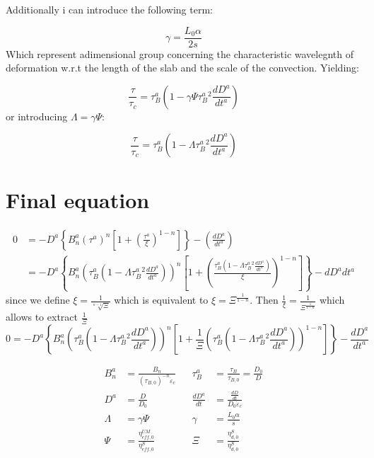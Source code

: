 \documentclass{article}
\begin{document}
Additionally i can introduce the following term: 

\begin{equation}
    \gamma = \frac{L_0 \alpha}{2 s}
\end{equation}
Which represent adimensional group concerning the characteristic wavelegnth of deformation w.r.t the length of the slab and the scale of the convection. 
Yielding: 

\begin{equation}
    \frac{\tau}{\tau_c} = \tau^{a}_{B} \left( 1-\gamma \Psi \tau^{a}_B^2 \frac{dD^{a}}{dt^{a}}\right)
    \label{eq:no_d_tau_eff}
\end{equation}
or introducing $\Lambda= \gamma \Psi$: 

\begin{equation}
    \frac{\tau}{\tau_c} = \tau^{a}_{B} \left( 1-\Lambda \tau^{a}_B^2 \frac{dD^{a}}{dt^{a}}\right)
    \label{eq:no_d_tau_eff}
\end{equation}

\section{Final equation}

\begin{align}
    0 &= -D^{a} \left\{B_n^{a}  \left(\tau^{a}\right)^n \left[ 1+ \left( \frac{\tau^{a}}{\xi} \right)^{1-n} \right] \right\} -\left(\frac{dD^{a}}{dt^{a}}\right)\\
    &=-D^{a} \left\{B_n^{a}  \left(\tau^{a}_{B} \left( 1-\Lambda \tau^{a}_B^2 \frac{dD^{a}}{dt^{a}}\right)\right)^n \left[ 1+ \left( \frac{\tau^{a}_{B} \left( 1-\Lambda \tau^{a}_B^2 \frac{dD^{a}}{dt^{a}}\right)}{\xi} \right)^{1-n} \right] \right\} -{dD^{a}}{dt^{a}}
  \label{eq:Main_equation}
\end{align}
since we define $\xi = \frac{1}{\sqrt[n-1]{\Xi}}$ which is equivalent to $\xi=\Xi^{\frac{1}{1-n}}$. Then $\frac{1}{\xi}=\frac{1}{\Xi^{\frac{1}{1-n}}}$ which allows to extract $\frac{1}{\Xi}$
\begin{equation}
    0 =-D^{a}\left\{B_n^{a}\left(\tau^{a}_{B} \left( 1- \Lambda \tau^{a}_B^2 \frac{dD^{a}}{dt^{a}}\right)\right)^n \left[ 1+ \frac{1}{\Xi}\left( \tau^{a}_{B} \left( 1-\Lambda\tau^{a}_B^2 \frac{dD^{a}}{dt^{a}}\right)\right)^{1-n} \right] \right\} -\frac{dD^{a}}{dt^{a}}
  \label{eq:Main_equation}
\end{equation}

\begin{align}
    B_n^{a} &= \frac{B_n}{(\tau_{B,0})^{-n}\dot{\varepsilon}_c} && \tau^{a}_{B} &= \frac{\tau_{B}}{\tau_{B,0}} = \frac{D_0}{D}\\ 
    D^{a} &= \frac{D}{D_0}  && \frac{dD^{a}}{dt} &= \frac{\frac{dD}{dt}}{D_0 \dot{\varepsilon}_c} \\
    \Lambda &= \gamma \Psi && \gamma &= \frac{L_0\alpha}{s} \\ 
    \Psi &= \frac{\eta^{UM}_{eff,0}}{\eta^{S}_{eff,0}} && \Xi &= \frac{\eta^{S}_{d,0}}{\eta^{S}_{d,0}}
\end{align}
\end{document}
